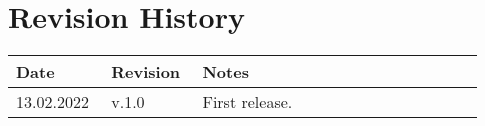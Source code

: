 \section{Revision History}

\begin{center}
	\begin{longtable}{@{}p{0.18\linewidth} p{0.18\linewidth} p{0.57\linewidth}@{}}
		\toprule
		\textbf{Date}   & \textbf{Revision} & \textbf{Notes}\\
		\midrule
        13.02.2022     	& v.1.0             & First release.\\
		\bottomrule
	\end{longtable}
\end{center}

\printbibliography[title={Reference Documents}, keyword=intro, heading=subbibnumbered]
